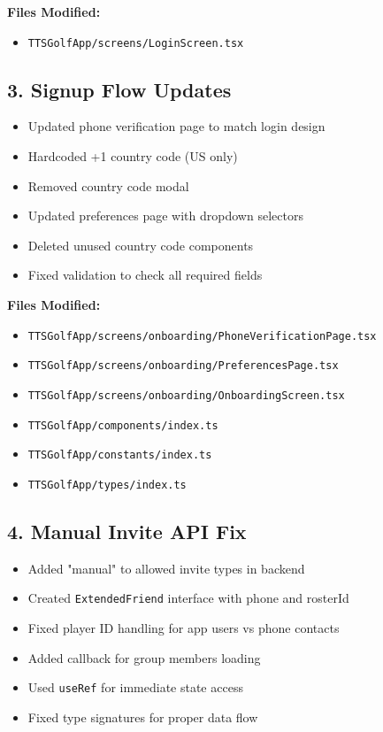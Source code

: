 \documentclass[11pt,a4paper]{article}
\newcommand{\done}{\textcolor{checkgreen}{$\checkmark$}}
\begin{document}
\textbf{Files Modified:}
\begin{itemize}
    \item \texttt{TTSGolfApp/screens/LoginScreen.tsx}
\end{itemize}

\subsection{3. Signup Flow Updates}
\begin{itemize}[label=\done]
    \item Updated phone verification page to match login design
    \item Hardcoded +1 country code (US only)
    \item Removed country code modal
    \item Updated preferences page with dropdown selectors
    \item Deleted unused country code components
    \item Fixed validation to check all required fields
\end{itemize}

\textbf{Files Modified:}
\begin{itemize}
    \item \texttt{TTSGolfApp/screens/onboarding/PhoneVerificationPage.tsx}
    \item \texttt{TTSGolfApp/screens/onboarding/PreferencesPage.tsx}
    \item \texttt{TTSGolfApp/screens/onboarding/OnboardingScreen.tsx}
    \item \texttt{TTSGolfApp/components/index.ts}
    \item \texttt{TTSGolfApp/constants/index.ts}
    \item \texttt{TTSGolfApp/types/index.ts}
\end{itemize}

\subsection{4. Manual Invite API Fix}
\begin{itemize}[label=\done]
    \item Added "manual" to allowed invite types in backend
    \item Created \texttt{ExtendedFriend} interface with phone and rosterId
    \item Fixed player ID handling for app users vs phone contacts
    \item Added callback for group members loading
    \item Used \texttt{useRef} for immediate state access
    \item Fixed type signatures for proper data flow
\end{itemize}
\end{document}

